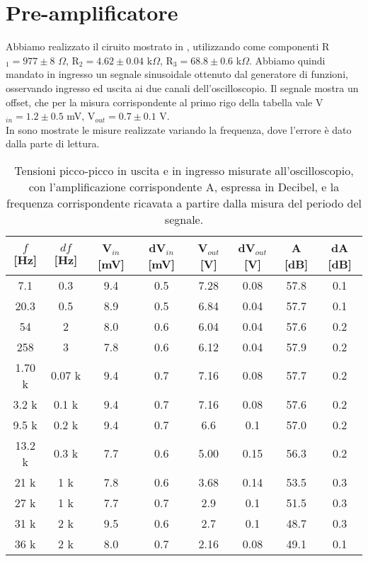 \section{Pre-amplificatore}
Abbiamo realizzato il ciruito mostrato in , utilizzando come componenti R$_1 = 977 \pm 8$ $\Omega$, R$_2 = 4.62 \pm 0.04$ k$\Omega$, R$_3 = 68.8 \pm 0.6$ k$\Omega$. Abbiamo quindi mandato in ingresso un segnale sinusoidale ottenuto dal generatore di funzioni, osservando ingresso ed uscita ai due canali dell'oscilloscopio. Il segnale mostra un offset, che per la misura corrispondente al primo rigo della tabella vale V$_{in} = 1.2 \pm 0.5$ mV, V$_{out} = 0.7 \pm 0.1$ V.\\ In  sono mostrate le misure realizzate variando la frequenza, dove l'errore è dato dalla parte di lettura.\\
\begin{table}[h]
	\centering
	\begin{tabular}{cccccccc}		
		 {$f$ [Hz]}& {$df$ [Hz]}& {V$_{in}$ [mV]} & {dV$_{in}$ [mV]} & {V$_{out}$ [V]} & {dV$_{out}$ [V]} & {A [dB]} & {dA [dB]}\\
		 \midrule
                       7.1 & 0.3 & 9.4 & 0.5 & 7.28 & 0.08 & 57.8 & 0.1\\
                       20.3 & 0.5 & 8.9 & 0.5 & 6.84 & 0.04 & 57.7 & 0.1\\
                       54 & 2 & 8.0 & 0.6 & 6.04 & 0.04 & 57.6 & 0.2\\ 
                       258 & 3 & 7.8 & 0.6 & 6.12 & 0.04 & 57.9 & 0.2\\
                       1.70 k& 0.07 k& 9.4 & 0.7 & 7.16 & 0.08 & 57.7 & 0.2\\
                       3.2 k& 0.1 k& 9.4 & 0.7 & 7.16 & 0.08 & 57.6 & 0.2\\
                       9.5 k& 0.2 k& 9.4 & 0.7 & 6.6 & 0.1 & 57.0 & 0.2\\ 
                       13.2 k& 0.3 k& 7.7 & 0.6 & 5.00 & 0.15 & 56.3 & 0.2\\
                       21 k& 1 k& 7.8 & 0.6 & 3.68 & 0.14 & 53.5 & 0.3\\
                       27 k& 1 k& 7.7 & 0.7 & 2.9 & 0.1 & 51.5 & 0.3\\
                       31 k& 2 k& 9.5 & 0.6 & 2.7 & 0.1 & 48.7 & 0.3\\
                       36 k& 2 k& 8.0 & 0.7 & 2.16 & 0.08 & 49.1 & 0.1\\
 	\end{tabular}
	\caption{ Tensioni picco-picco in uscita e in ingresso misurate all'oscilloscopio, con l'amplificazione corrispondente A, espressa in Decibel, e la frequenza corrispondente ricavata a partire dalla misura del periodo del segnale.}
	\label{t:pre-amp}
\end{table}
